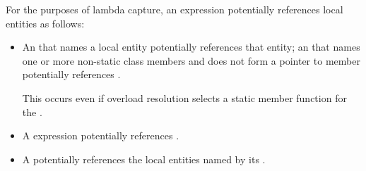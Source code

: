 \pnum
For the purposes of lambda capture,
an expression potentially references local entities as follows:
\begin{itemize}
\item
An  that names a local entity
potentially references that entity;
an  that names
one or more non-static class members
and does not form a pointer to member
potentially references .
\begin{note}
This occurs even if overload resolution
selects a static member function for the .
\end{note}

\item
A  expression potentially references .

\item
A  potentially references
the local entities named by its .
\end{itemize}

